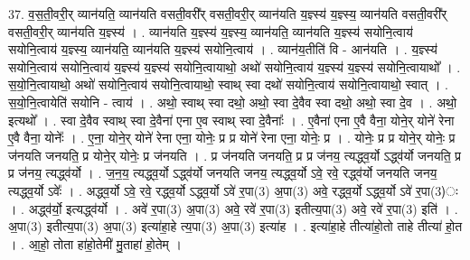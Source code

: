\documentclass[17pt]{extarticle}
\begin{document}
37. व॒स॒ती॒वरी॒र् व्यान॑यति॒ व्यान॑यति वसती॒वरी᳚र् वसती॒वरी॒र् व्यान॑यति य॒ज्ञ्स्य॑ य॒ज्ञ्स्य॒ व्यान॑यति वसती॒वरी᳚र् वसती॒वरी॒र् व्यान॑यति य॒ज्ञ्स्य॑ । . व्यान॑यति य॒ज्ञ्स्य॑ य॒ज्ञ्स्य॒ व्यान॑यति॒ व्यान॑यति य॒ज्ञ्स्य॑ सयोनि॒त्वाय॑ सयोनि॒त्वाय॑ य॒ज्ञ्स्य॒ व्यान॑यति॒ व्यान॑यति य॒ज्ञ्स्य॑ सयोनि॒त्वाय॑ । . व्यान॑य॒तीति॑ वि - आन॑यति । . य॒ज्ञ्स्य॑ सयोनि॒त्वाय॑ सयोनि॒त्वाय॑ य॒ज्ञ्स्य॑ य॒ज्ञ्स्य॑ सयोनि॒त्वायाथो॒ अथो॑ सयोनि॒त्वाय॑ य॒ज्ञ्स्य॑ य॒ज्ञ्स्य॑ सयोनि॒त्वायाथो᳚ । . स॒यो॒नि॒त्वायाथो॒ अथो॑ सयोनि॒त्वाय॑ सयोनि॒त्वायाथो॒ स्वाथ् स्वा दथो॑ सयोनि॒त्वाय॑ सयोनि॒त्वायाथो॒ स्वात् । . स॒यो॒नि॒त्वायेति॑ सयोनि - त्वाय॑ । . अथो॒ स्वाथ् स्वा दथो॒ अथो॒ स्वा दे॒वैव स्वा दथो॒ अथो॒ स्वा दे॒व । . अथो॒ इत्यथो᳚ । . स्वा दे॒वैव स्वाथ् स्वा दे॒वैना॑ एना ए॒व स्वाथ् स्वा दे॒वैनाः᳚ । . ए॒वैना॑ एना ए॒वै वैना॒ योने॒र् योने॑ रेना ए॒वै वैना॒ योनेः᳚ । . ए॒ना॒ योने॒र् योने॑ रेना एना॒ योनेः॒ प्र प्र योने॑ रेना एना॒ योनेः॒ प्र । . योनेः॒ प्र प्र योने॒र् योनेः॒ प्र ज॑नयति जनयति॒ प्र योने॒र् योनेः॒ प्र ज॑नयति । . प्र ज॑नयति जनयति॒ प्र प्र ज॑नय॒ त्यद्ध्व॒र्यो ऽद्ध्व॑र्यो जनयति॒ प्र प्र ज॑नय॒ त्यद्ध्व॑र्यो । . ज॒न॒य॒ त्यद्ध्व॒र्यो ऽद्ध्व॑र्यो जनयति जनय॒ त्यद्ध्व॒र्यो ऽवे॒ रवे॒ रद्ध्व॑र्यो जनयति जनय॒ 
त्यद्ध्व॒र्यो ऽवेः᳚ । . अद्ध्व॒र्यो ऽवे॒ रवे॒ रद्ध्व॒र्यो ऽद्ध्व॒र्यो ऽवे॑ र॒पा(3) अ॒पा(3) अवे॒ रद्ध्व॒र्यो ऽद्ध्व॒र्यो ऽवे॑ र॒पा(3)ः । . अद्ध्व॑र्यो॒ इत्यद्ध्व॑र्यो । . अवे॑ र॒पा(3) अ॒पा(3) अवे॒ रवे॑ र॒पा(3) इतीत्य॒पा(3) अवे॒ रवे॑ र॒पा(3) इति॑ । . अ॒पा(3) इतीत्य॒पा(3) अ॒पा(3) इत्या॑हा॒हे त्य॒पा(3) अ॒पा(3) इत्या॑ह । . इत्या॑हा॒हे तीत्या॑हो॒तो ताहे तीत्या॑ हो॒त । . आ॒हो॒ तोता हा॑हो॒तेमी॑ मु॒ताहा॑ हो॒तेम् । \newline
\end{document}
